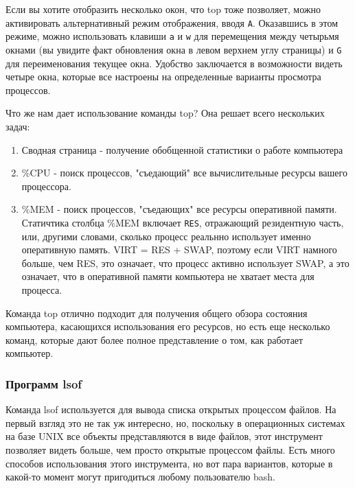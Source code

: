 \documentclass{report}
\begin{document}
Если вы хотите отобразить несколько окон, что top тоже позволяет, можно
активировать альтернативный режим отображения, вводя \texttt{A}.
Оказавшись в этом режиме, можно использовать клавиши \texttt{a} и
\texttt{w} для перемещения между четырьмя окнами (вы увидите факт
обновления окна в левом верхнем углу страницы) и \texttt{G} для
переименования текущее окна. Удобство заключается в возможности видеть
четыре окна, которые все настроены на определенные варианты просмотра
процессов.

Что же нам дает использование команды top? Она решает всего нескольких
задач:

\begin{enumerate}
\tightlist
\item
  Сводная страница - получение обобщенной статистики о работе компьютера
\item
  \%CPU - поиск процессов, "съедающий" все вычислительные ресурсы вашего
  процессора.
\item
  \%MEM - поиск процессов, "съедающих" все ресурсы оперативной памяти.
  Статичтика столбца \%MEM включает \texttt{RES}, отражающий резидентную
  часть, или, другими словами, сколько процесс реальнно использует
  именно оперативную память. VIRT = RES + SWAP, поэтому если VIRT
  намного больше, чем RES, это означает, что процесс активно использует
  SWAP, а это означает, что в оперативной памяти компьютера не хватает
  места для процесса.
\end{enumerate}

Команда top отлично подходит для получения общего обзора состояния
компьютера, касающихся использования его ресурсов, но есть еще несколько
команд, которые дают более полное представление о том, как работает
компьютер.

\hypertarget{lsof}{%
\subsubsection{\texorpdfstring{\protect\hyperlink{lsof}{}Программ
lsof}{Программ lsof}}\label{lsof}}

Команда lsof используется для вывода списка открытых процессом файлов.
На первый взгляд это не так уж интересно, но, поскольку в операционных
системах на базе UNIX все объекты представляются в виде файлов, этот
инструмент позволяет видеть больше, чем просто открытые процессом файлы.
Есть много способов использования этого инструмента, но вот пара
вариантов, которые в какой-то момент могут пригодиться любому
пользователю bash.
\end{document}
